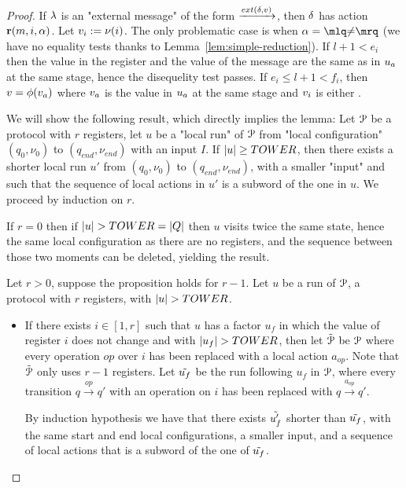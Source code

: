 \begin{proof}
If $\lambda$ is an "external message" of the form $\extbr{\atrans}{\aval}$, then $\delta$ has action $\textbf{r}(m, i, \alpha)$. Let $v_i := \nu(i)$. The only problematic case is when $\anact = \quotemarks{\diseqtestact}$ (we have no equality tests thanks to Lemma~\ref{lem:simple-reduction}). If $l+1<e_i$ then the value in the register and the value of the message are the same as in $u_a$ at the same stage, hence the disequelity test passes. If $e_i \leq l+1 < f_i$, then $v = \phi(v_a)$ where $v_a$ is the value in $u_a$ at the same stage and $v_i$ is either $ $.   











	We will show the following result, which directly implies the lemma:
	Let $\mathcal{P}$ be a protocol with $r$ registers, let $u$ be a "local run" of $\mathcal{P}$ from "local configuration" $(q_0, \nu_0)$ to $(q_{end}, \nu_{end})$ with an input $I$. If $|u| \geq TOWER$, then there exists a shorter local run $u'$ from $(q_0, \nu_0)$ to $(q_{end}, \nu_{end})$, with a smaller "input" and such that the sequence of local actions in $u'$ is a subword of the one in $u$.
	We proceed by induction on $r$.
	
	If $r=0$ then if $|u| > TOWER = |Q|$ then $u$ visits twice the same state, hence the same local configuration as there are no registers, and the sequence between those two moments can be deleted, yielding the result.
	
	Let $r>0$, suppose the proposition holds for $r-1$.
	Let $u$ be a run of $\mathcal{P}$, a protocol with $r$ registers, with $|u| > TOWER$.
	
	\begin{itemize}
		\item If there exists $i \in [1,r]$ such that $u$ has a factor $u_f$ in which the value of register $i$ does not change and with $|u_f| > TOWER$, then let $\Tilde{\mathcal{P}}$ be $\mathcal{P}$ where every operation $op$ over $i$ has been replaced with a local action $a_{op}$. Note that $\Tilde{\mathcal{P}}$ only uses $r-1$ registers. 
		Let $\Tilde{u_f}$ be the run following $u_f$ in $\mathcal{P}$, where every transition $q \xrightarrow{op} q'$ with an operation on $i$ has been replaced with $q \xrightarrow{a_{op}} q'$.
		
		By induction hypothesis we have that there exists $\Tilde{u'_f}$ shorter than $\Tilde{u_f}$, with the same start and end local configurations, a smaller input, and a sequence of local actions that is a subword of the one of $\Tilde{u_f}$.
		

\end{itemize}
\end{proof}
